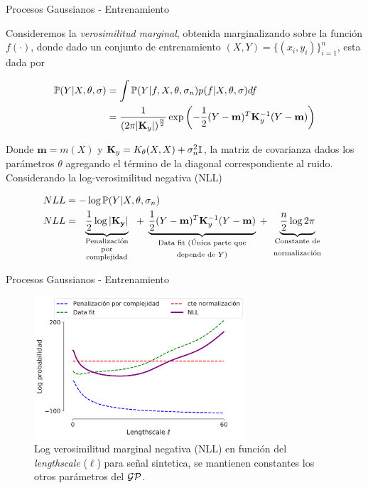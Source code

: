 \documentclass[9pt]{beamer}
\begin{document}
\begin{frame}{Procesos Gaussianos - Entrenamiento}

    Consideremos la \textit{verosimilitud marginal}, obtenida marginalizando sobre la función $f(\cdot)$, donde dado un conjunto de entrenamiento $(X, Y)= \{(x_i, y_i)\}_{i=1}^{n}$, esta dada por \pause

    \begin{align*}
        \mathbb{P}(Y|X, \theta, \sigma) & = \int \mathbb{P}(Y|f, X, \theta, \sigma_n) p(f|X,\theta, \sigma) df \\
        & = \frac{1}{\left( 2\pi |\mathbf{K}_y|\right)^{\frac{n}{2}}} 
        \exp \left(
        -\frac{1}{2} (Y - \mathbf{m})^T \mathbf{K}_y^{-1} (Y - \mathbf{m})
        \right)
    \end{align*} \pause 
    
    Donde $\mathbf{m}=m(X)$ y $\mathbf{K}_y=K_{\theta}(X,X) + \sigma_n^2 {\mathbb I}$, la matriz de covarianza dados los parámetros $\theta$ agregando el término de la diagonal correspondiente al ruido.\\ \pause 
    Considerando la log-verosimilitud negativa (NLL)

    \begin{align*}
        NLL & = -\log \pr(Y|X, \theta, \sigma_n) \\
        NLL & = \underbrace{ \color{black}{\frac{1}{2}\log|\mathbf{K_y}|} }_
            {\text{\parbox{2cm}{\centering Penalización\\[-4pt] por\\[-4pt] complejidad}}}
            + \underbrace{ \color{black}{\frac{1}{2}(Y - \mathbf{m})^T \mathbf{K}_y^{-1} (Y - \mathbf{m}) }}_
            {\text{\parbox{4cm}{\centering Data fit (Única parte que depende de $Y$)}}}
            + \underbrace{ \color{black}{\frac{n}{2} \log2\pi}}_
            {\text{\parbox{2cm}{\centering Constante de normalización}}}
    \end{align*}

    
\end{frame}

\begin{frame}{Procesos Gaussianos - Entrenamiento}
    \begin{figure}[H]
        \centering
        \includegraphics[width=0.7\textwidth]{../img/cap8_nll_partes}
        \caption{Log verosimilitud marginal negativa (NLL) en función del \textit{lengthscale} ($\ell$) para señal sintetica, se mantienen constantes los otros parámetros del $\mathcal{GP}$.}
    \end{figure}
\end{frame}
\end{document}
